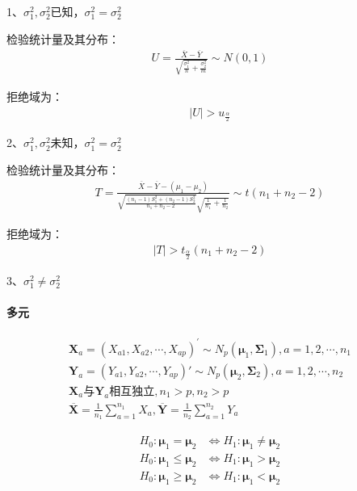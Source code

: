 \documentclass[12pt]{book}
\begin{document}
1、$\sigma_1^2,\sigma_2^2$已知，$\sigma_1^2=\sigma_2^2$

检验统计量及其分布：
\begin{gather*}
    U=\frac{\overline{X}-\overline{Y}}{\sqrt{\frac{\sigma_1^2}{n}+\frac{\sigma_2^2}{m}}}\sim N(0,1)
\end{gather*}


拒绝域为：
\begin{gather*}
    \left|U\right|>u_{\frac{\alpha}{2}}
\end{gather*}


2、$\sigma_1^2,\sigma_2^2$未知，$\sigma_1^2=\sigma_2^2$

检验统计量及其分布：
\begin{gather*}
    T=\frac{\overline{X}-\overline{Y}-(\mu_1-\mu_2)}{\sqrt{\frac{\left(n_1-1\right)S_1^2+\left(n_2-1\right)S_2^2}{n_1+n_2-2}}\sqrt{\frac{1}{n_1}+\frac{1}{n_2}}}\sim t(n_1+n_2-2)
\end{gather*}


拒绝域为：
\begin{gather*}
    \left|T\right|>t_{\frac{\alpha}{2}}(n_1+n_2-2)
\end{gather*}


3、$\sigma_1^2\neq\sigma_2^2$














\paragraph{多元}


\begin{gather*}
    \mathbf{X}_{a}=(X_{a1},X_{a2},\cdots,X_{ap})^\prime \sim N_p(\bm{\mu}_1,\bm{\Sigma}_1), a=1,2,\cdots,n_1\\
    \bm{Y}_a=\left(Y_{a1},Y_{a2},\cdots,Y_{ap}\right)' \sim N_p(\bm{\mu}_2,\mathbf{\Sigma}_2), a=1,2,\cdots,n_2 \\
    \mathbf{X}_{a}与\mathbf{Y}_a\text{相互独立}, n_1>p, n_2>p\\
    \overline{\bm{X}}=\frac{1}{n_1}\sum_{a=1}^{n_1}{X_a}, \overline{\bm{Y}}=\frac{1}{n_2}\sum_{a=1}^{n_2}{Y_a}
\end{gather*}



\begin{align*}
    H_0:\bm{\mu}_1=\bm{\mu}_2    & \Leftrightarrow H_1:\bm{\mu}_1\neq\bm{\mu}_2 \\
    H_0:\bm{\mu}_1\le\bm{\mu}_2  & \Leftrightarrow  H_1:\bm{\mu}_1>\bm{\mu}_2   \\
    H_0:\bm{\mu}_1\geq\bm{\mu}_2 & \Leftrightarrow H_1:\bm{\mu}_1<\bm{\mu}_2
\end{align*}
\end{document}
